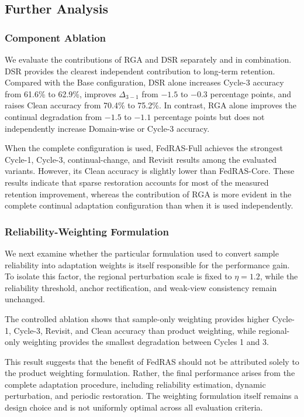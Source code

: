 \documentclass[journal]{IEEEtran}
\begin{document}
\subsection{Further Analysis}

\subsubsection{Component Ablation}
We evaluate the contributions of RGA and DSR separately and in combination. DSR provides the clearest independent contribution to long-term retention. Compared with the Base configuration, DSR alone increases Cycle-3 accuracy from 61.6\% to 62.9\%, improves $\Delta_{3-1}$ from $-1.5$ to $-0.3$ percentage points, and raises Clean accuracy from 70.4\% to 75.2\%. In contrast, RGA alone improves the continual degradation from $-1.5$ to $-1.1$ percentage points but does not independently increase Domain-wise or Cycle-3 accuracy.

When the complete configuration is used, FedRAS-Full achieves the strongest Cycle-1, Cycle-3, continual-change, and Revisit results among the evaluated variants. However, its Clean accuracy is slightly lower than FedRAS-Core. These results indicate that sparse restoration accounts for most of the measured retention improvement, whereas the contribution of RGA is more evident in the complete continual adaptation configuration than when it is used independently.

\subsubsection{Reliability-Weighting Formulation}
We next examine whether the particular formulation used to convert sample reliability into adaptation weights is itself responsible for the performance gain. To isolate this factor, the regional perturbation scale is fixed to $\eta = 1.2$, while the reliability threshold, anchor rectification, and weak-view consistency remain unchanged.

The controlled ablation shows that sample-only weighting provides higher Cycle-1, Cycle-3, Revisit, and Clean accuracy than product weighting, while regional-only weighting provides the smallest degradation between Cycles 1 and 3.

This result suggests that the benefit of FedRAS should not be attributed solely to the product weighting formulation. Rather, the final performance arises from the complete adaptation procedure, including reliability estimation, dynamic perturbation, and periodic restoration. The weighting formulation itself remains a design choice and is not uniformly optimal across all evaluation criteria.
\end{document}
